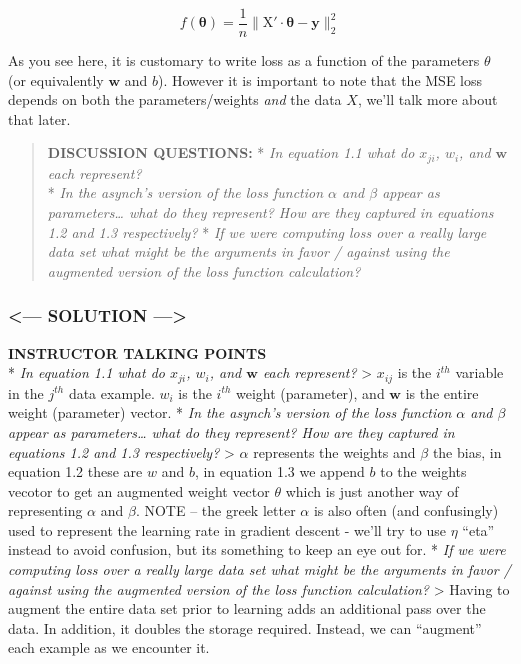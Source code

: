 \documentclass[11pt]{article}
\begin{document}
\begin{equation}\tag{1.4}
f(\boldsymbol{\theta}) = \frac{1}{n}\|\text{X}'\cdot \boldsymbol{\theta} - \mathbf{y}\|_2^2
\end{equation}

As you see here, it is customary to write loss as a function of the
parameters \(\theta\) (or equivalently \(\mathbf{w}\) and \(b\)).
However it is important to note that the MSE loss depends on both the
parameters/weights \emph{and} the data \(X\), we'll talk more about that
later.

    \begin{quote}
\textbf{DISCUSSION QUESTIONS:} * \emph{In equation 1.1 what do
\(x_{ji}\), \(w_i\), and \(\mathbf{w}\) each represent?}\\
* \emph{In the asynch's version of the loss function \(\alpha\) and
\(\beta\) appear as parameters\ldots{} what do they represent? How are
they captured in equations 1.2 and 1.3 respectively?} * \emph{If we were
computing loss over a really large data set what might be the arguments
in favor / against using the augmented version of the loss function
calculation?}
\end{quote}

    \hypertarget{solution}{%
\subsubsection{\textless{}--- SOLUTION
---\textgreater{}}\label{solution}}

\textbf{INSTRUCTOR TALKING POINTS}\\
* \emph{In equation 1.1 what do \(x_{ji}\), \(w_i\), and \(\mathbf{w}\)
each represent?} \textgreater{} \(x_{ij}\) is the \(i^{th}\) variable in
the \(j^{th}\) data example. \(w_i\) is the \(i^{th}\) weight
(parameter), and \(\mathbf{w}\) is the entire weight (parameter) vector.
* \emph{In the asynch's version of the loss function \(\alpha\) and
\(\beta\) appear as parameters\ldots{} what do they represent? How are
they captured in equations 1.2 and 1.3 respectively?} \textgreater{}
\(\alpha\) represents the weights and \(\beta\) the bias, in equation
1.2 these are \(w\) and \(b\), in equation 1.3 we append \(b\) to the
weights vecotor to get an augmented weight vector \(\theta\) which is
just another way of representing \(\alpha\) and \(\beta\). NOTE -- the
greek letter \(\alpha\) is also often (and confusingly) used to
represent the learning rate in gradient descent - we'll try to use
\(\eta\) ``eta'' instead to avoid confusion, but its something to keep
an eye out for. * \emph{If we were computing loss over a really large
data set what might be the arguments in favor / against using the
augmented version of the loss function calculation?} \textgreater{}
Having to augment the entire data set prior to learning adds an
additional pass over the data. In addition, it doubles the storage
required. Instead, we can ``augment'' each example as we encounter it.
\end{document}
